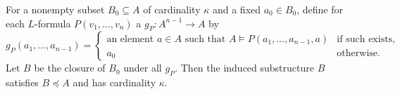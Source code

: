 For a nonempty subset $B_0 \subseteq A$ of cardinality $\kappa$ and a fixed $a_0 \in B_0$, define for each $L$-formula $P(v_1, \ldots, v_n)$ a  $g_P : A^{n-1} \rightarrow A$ by
$$g_P(a_1, \ldots, a_{n-1}) = \begin{cases}
\text{an element } a \in A \text{ such that } A \vDash P(a_1, \ldots, a_{n-1}, a) & \text{if such exists,} \\
a_0 & \text{otherwise.}
\end{cases}$$
Let $B$ be the closure of $B_0$ under all $g_P$. Then the induced substructure $B$ satisfies $B \preceq A$ and has cardinality $\kappa$.
